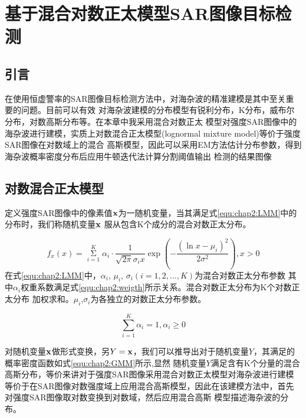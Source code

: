 \chapter{基于混合对数正太模型SAR图像目标检测}
\label{cha:LMM}

\section{引言}
\label{sec:chap2:sec1}
在使用恒虚警率的SAR图像目标检测方法中，对海杂波的精准建模是其中至关重要的问题。目前可以有效
对海杂波建模的分布模型有锐利分布，K分布，威布尔分布，对数高斯分布等。在本章中我采用混合对数正太
模型对强度SAR图像中的海杂波进行建模，实质上对数混合正太模型(lognormal mixture model)等价于强度SAR图像在对数域上的混合
高斯模型，因此可以采用EM方法估计分布参数，得到海杂波概率密度分布后应用牛顿迭代法计算分割阈值输出
检测的结果图像


\section{对数混合正太模型}
\label{sec:chap2:sec2}
  定义强度SAR图像中的像素值$\bf{x}$为一随机变量，当其满足式\ref{equ:chap2:LMM}中的分布时，我们称随机变量$\bf{x}$
  服从包含K个成分的混合对数正太分布。

    \begin{equation}
      \label{equ:chap2:LMM}
      {f_x}(x) = \mathop \Sigma \limits_{i = 1}^K {\alpha _i} \cdot \frac{1}{{\sqrt {2\pi } {\sigma _i}x}}\exp ( - \frac{{{{(\ln x - {\mu _i})}^2}}}{{2{\sigma ^2}}}),x > 0
    \end{equation}
  在式\ref{equ:chap2:LMM}中，$\alpha_i$, $\mu_i$, $\sigma_i(i=1,2,...,K)$为混合对数正太分布参数
  其中$\alpha_i$权重系数满足式\ref{equ:chap2:weigth}所示关系。混合对数正太分布为K个对数正太分布
  加权求和。$\mu_i$,$\sigma_i$为各独立的对数正太分布参数。

    \begin{equation}
      \label{equ:chap2:weigth}
      \sum\limits_{i = 1}^K {{\alpha _i} = 1,{\alpha _i} \ge 0} 
    \end{equation}

  对随机变量$\bf{x}$做形式变换，另$Y=\bf{x}$，我们可以推导出对于随机变量$Y$，其满足的概率密度函数如式\ref{equ:chap2:GMM}所示,显然
  随机变量$Y$满足含有K个分量的混合高斯分布，等价来讲对于强度SAR图像采用混合对数正太模型对海杂波进行建模
  等价于在SAR图像对数强度域上应用混合高斯模型，因此在该建模方法中，首先对强度SAR图像取对数变换到对数域，然后应用混合高斯
  模型描述海杂波的分布。

